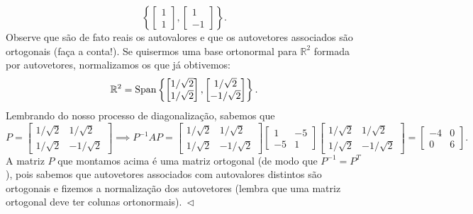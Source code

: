 \documentclass[../livro.tex]{subfiles}
\begin{document}
\begin{example}
	\begin{equation}
	\left\lbrace 
	\begin{bmatrix}
	1 \\
	1
	\end{bmatrix}, 
	\begin{bmatrix}
	1 \\
	-1
	\end{bmatrix}
	\right\rbrace.
	\end{equation} Observe que são de fato reais os autovalores e que os autovetores associados são ortogonais (faça a conta!). Se quisermos uma base ortonormal para $\mathbb{R}^2$ formada por autovetores, normalizamos os que já obtivemos:
	\begin{equation}
	\mathbb{R}^2 = \operatorname{Span} \left\lbrace 
	\begin{bmatrix}
	1/\sqrt{2} \\
	1/\sqrt{2}
	\end{bmatrix}, 
	\begin{bmatrix}
	1/\sqrt{2} \\
	-1/\sqrt{2}
	\end{bmatrix}
	\right\rbrace.
	\end{equation} Lembrando do nosso processo de diagonalização, sabemos que
	\begin{equation}
	P =  
	\begin{bmatrix}
	1/\sqrt{2} &  1/\sqrt{2} \\
	1/\sqrt{2} & -1/\sqrt{2} 
	\end{bmatrix} \implies 
	P^{-1} A P = 
	\begin{bmatrix}
	1/\sqrt{2} &  1/\sqrt{2} \\
	1/\sqrt{2} & -1/\sqrt{2} 
	\end{bmatrix}
	\begin{bmatrix}
	1 & -5 \\
	-5 &  1
	\end{bmatrix}
	\begin{bmatrix}
	1/\sqrt{2} &  1/\sqrt{2} \\
	1/\sqrt{2} & -1/\sqrt{2} 
	\end{bmatrix} = 
	\begin{bmatrix}
	-4 & 0 \\
	0  & 6
	\end{bmatrix}.
	\end{equation} A matriz $P$ que montamos acima é uma matriz ortogonal (de modo que $P^{-1} = P^T$), pois sabemos que autovetores associados com autovalores distintos são ortogonais e fizemos a normalização dos autovetores (lembra que uma matriz ortogonal deve ter colunas ortonormais)$. \ \lhd$
\end{example}
\end{document}
